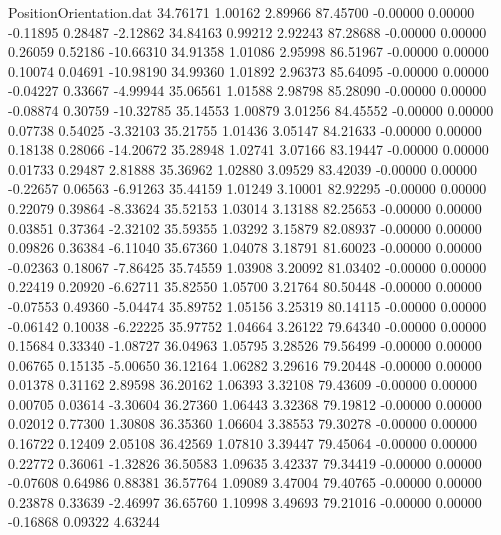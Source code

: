 \begin{filecontents}{PositionOrientation.dat}
  34.76171    1.00162    2.89966    87.45700   -0.00000    0.00000   -0.11895    0.28487   -2.12862
  34.84163    0.99212    2.92243    87.28688   -0.00000    0.00000    0.26059    0.52186  -10.66310
  34.91358    1.01086    2.95998    86.51967   -0.00000    0.00000    0.10074    0.04691  -10.98190
  34.99360    1.01892    2.96373    85.64095   -0.00000    0.00000   -0.04227    0.33667   -4.99944
  35.06561    1.01588    2.98798    85.28090   -0.00000    0.00000   -0.08874    0.30759  -10.32785
  35.14553    1.00879    3.01256    84.45552   -0.00000    0.00000    0.07738    0.54025   -3.32103
  35.21755    1.01436    3.05147    84.21633   -0.00000    0.00000    0.18138    0.28066  -14.20672
  35.28948    1.02741    3.07166    83.19447   -0.00000    0.00000    0.01733    0.29487    2.81888
  35.36962    1.02880    3.09529    83.42039   -0.00000    0.00000   -0.22657    0.06563   -6.91263
  35.44159    1.01249    3.10001    82.92295   -0.00000    0.00000    0.22079    0.39864   -8.33624
  35.52153    1.03014    3.13188    82.25653   -0.00000    0.00000    0.03851    0.37364   -2.32102
  35.59355    1.03292    3.15879    82.08937   -0.00000    0.00000    0.09826    0.36384   -6.11040
  35.67360    1.04078    3.18791    81.60023   -0.00000    0.00000   -0.02363    0.18067   -7.86425
  35.74559    1.03908    3.20092    81.03402   -0.00000    0.00000    0.22419    0.20920   -6.62711
  35.82550    1.05700    3.21764    80.50448   -0.00000    0.00000   -0.07553    0.49360   -5.04474
  35.89752    1.05156    3.25319    80.14115   -0.00000    0.00000   -0.06142    0.10038   -6.22225
  35.97752    1.04664    3.26122    79.64340   -0.00000    0.00000    0.15684    0.33340   -1.08727
  36.04963    1.05795    3.28526    79.56499   -0.00000    0.00000    0.06765    0.15135   -5.00650
  36.12164    1.06282    3.29616    79.20448   -0.00000    0.00000    0.01378    0.31162    2.89598
  36.20162    1.06393    3.32108    79.43609   -0.00000    0.00000    0.00705    0.03614   -3.30604
  36.27360    1.06443    3.32368    79.19812   -0.00000    0.00000    0.02012    0.77300    1.30808
  36.35360    1.06604    3.38553    79.30278   -0.00000    0.00000    0.16722    0.12409    2.05108
  36.42569    1.07810    3.39447    79.45064   -0.00000    0.00000    0.22772    0.36061   -1.32826
  36.50583    1.09635    3.42337    79.34419   -0.00000    0.00000   -0.07608    0.64986    0.88381
  36.57764    1.09089    3.47004    79.40765   -0.00000    0.00000    0.23878    0.33639   -2.46997
  36.65760    1.10998    3.49693    79.21016   -0.00000    0.00000   -0.16868    0.09322    4.63244

\end{filecontents}
